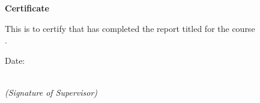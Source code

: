 \documentclass{article}
\begin{document}
	\begin{center}
		\Huge\textbf{Certificate}
	\end{center}
	\vspace{1cm}
	
	\noindent
	This is to certify that \underline{\hspace{6cm}} has completed the report titled \underline{\hspace{6cm}} for the course \underline{\hspace{2cm}} \\ \underline{\hspace{3cm}}.
	
	\vspace{2cm}
	\begin{flushright}
		Date: \underline{\hspace{3cm}}
		
		\underline{\hspace{8cm}} \\
		
		\textit{(Signature of Supervisor)}
	\end{flushright}
\end{document}

